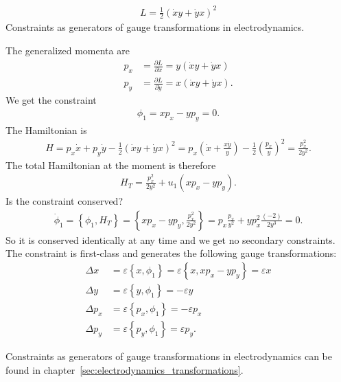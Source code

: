 \begin{exercise}
\begin{align*}
L = \frac{1}{2} (\dot{x}y + \dot{y}x)^2
\end{align*}
Constraints as generators of gauge transformations in electrodynamics. 
\end{exercise}
\begin{solution}
The generalized momenta are
\begin{align*}
p_x &= \frac{\partial L}{\partial \dot{x}} = y (\dot{x}y + \dot{y}x) \\
p_y &= \frac{\partial L}{\partial \dot{y}} = x (\dot{x}y + \dot{y}x).
\end{align*}
We get the constraint 
\begin{align*}
\phi_1 = x p_x - y p_y = 0.
\end{align*}
The Hamiltonian is
\begin{align*}
H = p_x \dot{x} + p_y \dot{y} - \frac{1}{2} (\dot{x}y + \dot{y}x)^2 = p_x \left(\dot{x} + \frac{x \dot{y}}{y}\right) - \frac{1}{2} \left(\frac{p_x}{y}\right)^2 = \frac{p_x^2}{2 y^2}.
\end{align*}
The total Hamiltonian at the moment is therefore
\begin{align*}
H_T = \frac{p_x^2}{2 y^2} + u_1 (x p_x - y p_y).
\end{align*}
Is the constraint conserved?
\begin{align*}
\dot{\phi}_1 = \left \{ \phi_1,H_T \right \} = \left \{ x p_x - y p_y,\frac{p_x^2}{2 y^2} \right \} = p_x \frac{p_x}{y^2} + y p_x^2 \frac{(-2)}{2 y^3} = 0.
\end{align*}
So it is conserved identically at any time and we get no secondary constraints. The constraint is first-class and generates the following gauge transformations:
\begin{align*}
\Delta x &= \varepsilon \left \{ x,\phi_1 \right \} = \varepsilon \left \{ x,x p_x - y p_y \right \} = \varepsilon x \\
\Delta y &= \varepsilon \left \{ y,\phi_1 \right \} = - \varepsilon y \\
\Delta p_x &= \varepsilon \left \{ p_x,\phi_1 \right \} = - \varepsilon p_x \\
\Delta p_y &= \varepsilon \left \{ p_y,\phi_1 \right \} = \varepsilon p_y.
\end{align*}

Constraints as generators of gauge transformations in electrodynamics can be found in chapter~\vref{sec:electrodynamics_transformations}.
\end{solution}




